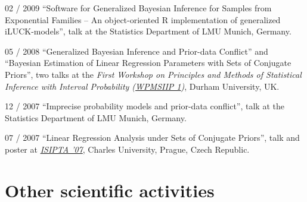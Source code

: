 \documentclass[a4paper]{simplecv}
\begin{document}
\begin{topic}
\item[02 / 2009] ``Software for Generalized Bayesian Inference for Samples from Exponential Families -- An object-oriented \textsf{R} implementation of generalized iLUCK-models'', talk at
                 the Statistics Department of LMU Munich, Germany.

\item[05 / 2008] ``Generalized Bayesian Inference and Prior-data Conflict'' and ``Bayesian Estimation of Linear Regression Parameters with Sets of Conjugate Priors'', two talks at the
                 \emph{First Workshop on Principles and Methods of Statistical Inference with Interval Probability (\href{http://www.maths.dur.ac.uk/users/matthias.troffaes/workshopip2008/index.html}{WPMSIIP 1})}, Durham University, UK.

\item[12 / 2007] ``Imprecise probability models and prior-data conflict'', talk at
                 the Statistics Department of LMU Munich, Germany.

\item[07 / 2007] ``Linear Regression Analysis under Sets of Conjugate Priors'', talk and poster at
                 \emph{\href{http://www.sipta.org/isipta07/}{ISIPTA '07}}, Charles University, Prague, Czech Republic.

\end{topic}




\section{Other scientific activities}
\label{other}
\end{document}
